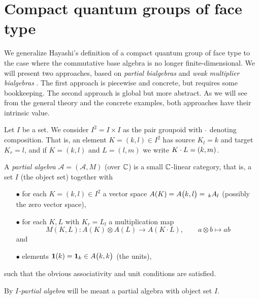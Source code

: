 \section{Compact quantum groups of face type}

We generalize Hayashi's definition of a compact quantum group of face type \cite{Hay1} to the case where the commutative base algebra is no longer finite-dimensional. We will present two approaches, based on \emph{partial bialgebras} and \emph{weak multiplier bialgebras} \cite{Boh1}. The first approach is piecewise and concrete, but requires some bookkeeping. The second approach is global but more abstract. As we will see from the general theory and the concrete examples, both approaches have their intrinsic value.




Let $I$ be a set. We consider $I^2=I\times I$ as the pair groupoid with $\wmult$ denoting composition. That is, an element $K=(k,l)\in I^2$ has source $K_l = k$ and target $K_r=l$, and if $K=(k,l)$ and $L=(l,m)$ we write $K\wmult L = (k,m)$. %

\begin{Def} A \emph{partial algebra} $\mathscr{A}=(\mathscr{A},M)$ (over $\C$) is a small $\C$-linear category, that is, a set $I$ (the object set) together with %
\begin{itemize}
\item[$\bullet$] for each $K=(k,l)\in I^2$ a vector space $A(K) = \Grs{A}{k}{l}=\!\!\GrDA{A}{k}{l}$ (possibly the zero vector space),
\item[$\bullet$] for each $K,L$ with $K_r = L_l$ a multiplication map \[M(K,L):A(K) \otimes A(L)\rightarrow A(K\cdot L),\qquad a\otimes b \mapsto ab\]  and 
\item[$\bullet$] elements $\Unit(k) = \Unit_k \in \Grs{A}{k}{k}$ (the units), %
\end{itemize}
such that the obvious associativity and unit conditions are satisfied. 

By \emph{$I$-partial algebra} will be meant a partial algebra with object set $I$.
\end{Def}


